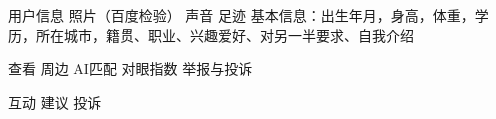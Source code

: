 
用户信息
  照片（百度检验）
  声音
  足迹
  基本信息：出生年月，身高，体重，学历，所在城市，籍贯、职业、兴趣爱好、对另一半要求、自我介绍

查看
  周边
  AI匹配
  对眼指数
  举报与投诉

互动
  建议
  投诉

